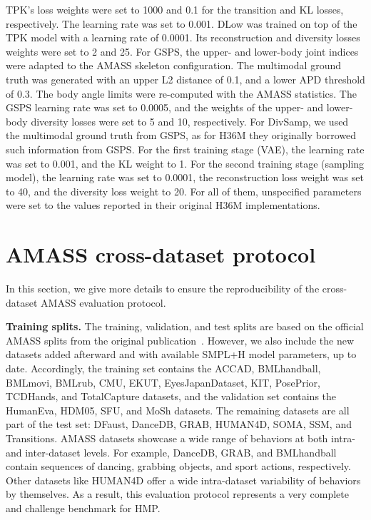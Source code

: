 \documentclass[10pt,twocolumn,letterpaper]{article}
\begin{document}
TPK's loss weights were set to 1000 and 0.1 for the transition and KL losses, respectively. The learning rate was set to 0.001. DLow was trained on top of the TPK model with a learning rate of 0.0001. Its reconstruction and diversity losses weights were set to 2 and 25. For GSPS, the upper- and lower-body joint indices were adapted to the AMASS skeleton configuration. The multimodal ground truth was generated with an upper L2 distance of 0.1, and a lower APD threshold of 0.3. The body angle limits were re-computed with the AMASS statistics. The GSPS learning rate was set to 0.0005, and the weights of the upper- and lower-body diversity losses were set to 5 and 10, respectively. For DivSamp, we used the multimodal ground truth from GSPS, as for H36M they originally borrowed such information from GSPS. For the first training stage (VAE), the learning rate was set to 0.001, and the KL weight to 1. For the second training stage (sampling model), the learning rate was set to 0.0001, the reconstruction loss weight was set to 40, and the diversity loss weight to 20.
For all of them, unspecified parameters were set to the values reported in their original H36M implementations.









 \section{AMASS cross-dataset protocol}
\label{sec:supp_dataset_details}

In this section, we give more details to ensure the reproducibility of the cross-dataset AMASS evaluation protocol.

\textbf{Training splits. } The training, validation, and test splits are based on the official AMASS splits from the original publication~\cite{mahmood2019amass}. However, we also include the new datasets added afterward and with available SMPL+H model parameters, up to date. Accordingly, the training set contains the ACCAD, BMLhandball, BMLmovi, BMLrub, CMU, EKUT, EyesJapanDataset, KIT, PosePrior, TCDHands, and TotalCapture datasets, and the validation set contains the HumanEva, HDM05, SFU, and MoSh datasets. The remaining datasets are all part of the test set: DFaust, DanceDB, GRAB, HUMAN4D, SOMA, SSM, and Transitions. AMASS datasets showcase a wide range of behaviors at both intra- and inter-dataset levels. For example, DanceDB, GRAB, and BMLhandball contain sequences of dancing, grabbing objects, and sport actions, respectively. Other datasets like HUMAN4D offer a wide intra-dataset variability of behaviors by themselves. As a result, this evaluation protocol represents a very complete and challenge benchmark for HMP.
\end{document}

